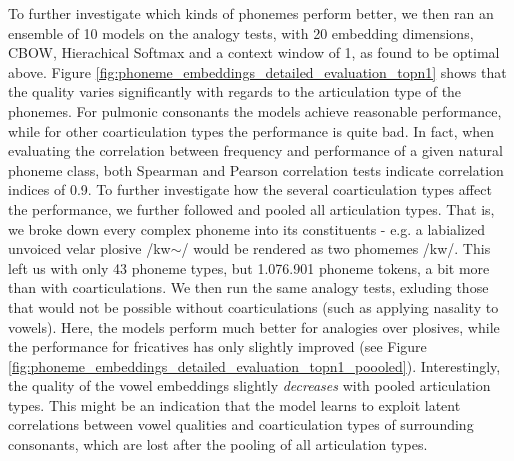 \documentclass[6pt]{article}
\begin{document}
To further investigate which kinds of phonemes perform better, we then ran an ensemble of 10 models on the analogy tests, with 20 embedding dimensions, CBOW, Hierachical Softmax and a context window of 1, as found to be optimal above.
Figure \ref{fig:phoneme_embeddings_detailed_evaluation_topn1} shows that the quality varies significantly with regards to the articulation type of the phonemes. For pulmonic consonants the models achieve reasonable performance, while for other coarticulation types the performance is quite bad. In fact, when evaluating the correlation between frequency and performance of a given natural phoneme class, both Spearman and Pearson correlation tests indicate correlation indices of 0.9. 
To further investigate how the several coarticulation types affect the performance, we further followed \cite{jager2014phylogenetic,rama2016siamese} and pooled all articulation types. That is, we broke down every complex phoneme into its constituents - e.g. a labialized unvoiced velar plosive /kw$\sim$/ would be rendered as two phomemes /kw/.  This left us with only 43 phoneme types, but 1.076.901 phoneme tokens, a bit more than with coarticulations. We then run the same analogy tests, exluding those that would not be possible without coarticulations (such as applying nasality to vowels). Here, the models perform much better for analogies over plosives, while the performance for fricatives has only slightly improved (see Figure \ref{fig:phoneme_embeddings_detailed_evaluation_topn1_poooled}). Interestingly, the quality of the vowel embeddings slightly \textit{decreases} with pooled articulation types. This might be an indication that the model learns to exploit latent correlations between vowel qualities and coarticulation types of surrounding consonants, which are lost after the pooling of all articulation types.
\end{document}
